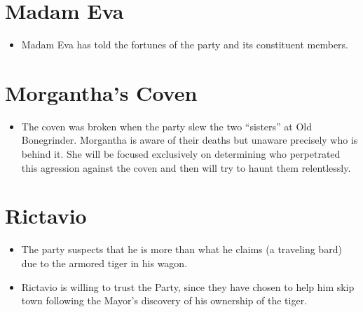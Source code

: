 \documentclass[a4paper,11pt]{article}
\begin{document}
\section{Madam Eva}
\begin{itemize}
  \item Madam Eva has told the fortunes of the party and its constituent members.
\end{itemize}

\section{Morgantha's Coven}
\begin{itemize}
  \item The coven was broken when the party slew the two ``sisters'' at Old Bonegrinder. Morgantha is aware of 
  their deaths but unaware precisely who is behind it. She will be focused exclusively on determining who 
  perpetrated this agression against the coven and then will try to haunt them relentlessly.
\end{itemize}

\section{Rictavio}
\begin{itemize}
  \item The party suspects that he is more than what he claims (a traveling bard) due to the armored tiger in his 
  wagon.
  \item Rictavio is willing to trust the Party, since they have chosen to help him skip town following the Mayor's
  discovery of his ownership of the tiger.
\end{itemize}
\end{document}
